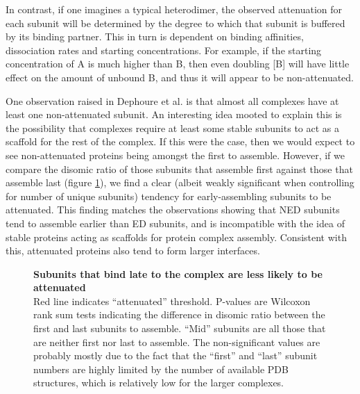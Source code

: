 \documentclass[a4paper,11pt,twoside,openright]{scrbook}
\begin{document}
In contrast, if one imagines a typical heterodimer, the observed attenuation for each subunit will be determined by the degree to which that subunit is buffered by its binding partner. This in turn is dependent on binding affinities, dissociation rates and starting concentrations. For example, if the starting concentration of A is much higher than B, then even doubling [B] will have little effect on the amount of unbound B, and thus it will appear to be non-attenuated.

One observation raised in Dephoure et al. is that almost all complexes have at least one non-attenuated subunit. An interesting idea mooted to explain this is the possibility that complexes require at least some stable subunits to act as a scaffold for the rest of the complex. If this were the case, then we would expect to see non-attenuated proteins being amongst the first to assemble. However, if we compare the disomic ratio of those subunits that assemble first against those that assemble last (figure \ref{figure:aneuploidy_assembly}), we find a clear (albeit weakly significant when controlling for number of unique subunits) tendency for early-assembling subunits to be attenuated. This finding matches the observations showing that NED subunits tend to assemble earlier than ED subunits, and is incompatible with the idea of stable proteins acting as scaffolds for protein complex assembly. Consistent with this, attenuated proteins also tend to form larger interfaces.

\begin{figure}[h]
    \caption[Subunits that bind late to the complex are less likely to be attenuated]{\sffamily \textbf{Subunits that bind late to the complex are less likely to be attenuated} \\ \small Red line indicates “attenuated” threshold. P-values are Wilcoxon rank sum tests indicating the difference in disomic ratio between the first and last subunits to assemble. “Mid” subunits are all those that are neither first nor last to assemble. The non-significant values are probably mostly due to the fact that the “first” and “last” subunit numbers are highly limited by the number of available PDB structures, which is relatively low for the larger complexes.}
    \label{figure:aneuploidy_assembly}
\end{figure}
\end{document}
